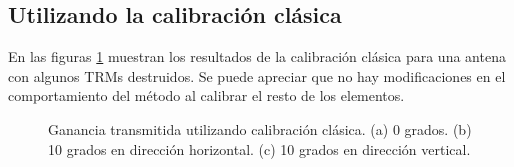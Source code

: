 \subsection{Utilizando la calibración clásica}

En las figuras \ref{fig:deadTRMsClassical} muestran los resultados de la calibración clásica para una antena con algunos TRMs destruidos. 
Se puede apreciar que no hay modificaciones en el comportamiento del método al calibrar el resto de los elementos.
\begin{figure}[H]
	\centering
 	
		\caption{Ganancia transmitida utilizando calibración clásica. (a) 0 grados. (b) 10 grados en 
		dirección horizontal. (c) 10 grados en dirección vertical.}
	\label{fig:deadTRMsClassical}
\end{figure}
